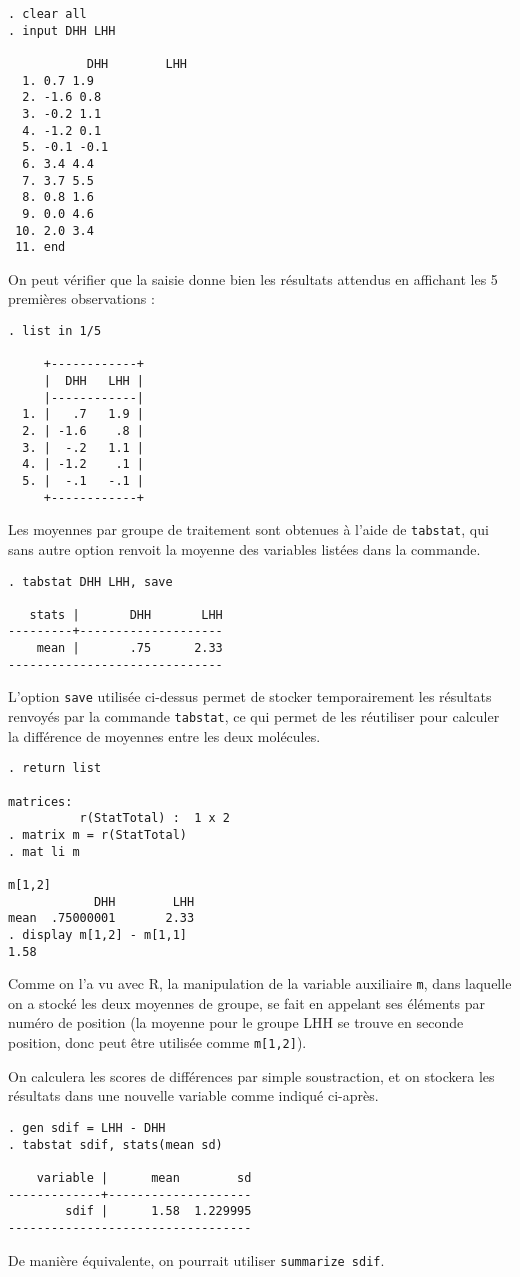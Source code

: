 \begin{verbatim}
. clear all
. input DHH LHH

           DHH        LHH
  1. 0.7 1.9
  2. -1.6 0.8
  3. -0.2 1.1
  4. -1.2 0.1
  5. -0.1 -0.1
  6. 3.4 4.4
  7. 3.7 5.5
  8. 0.8 1.6
  9. 0.0 4.6
 10. 2.0 3.4
 11. end
\end{verbatim}
On peut vérifier que la saisie donne bien les résultats attendus en
affichant les 5 premières observations :
\begin{verbatim}
. list in 1/5

     +------------+
     |  DHH   LHH |
     |------------|
  1. |   .7   1.9 |
  2. | -1.6    .8 |
  3. |  -.2   1.1 |
  4. | -1.2    .1 |
  5. |  -.1   -.1 |
     +------------+
\end{verbatim}

Les moyennes par groupe de traitement sont obtenues à l'aide de
\texttt{tabstat}, qui sans autre option renvoit la moyenne des variables
listées dans la commande.
\begin{verbatim}
. tabstat DHH LHH, save

   stats |       DHH       LHH
---------+--------------------
    mean |       .75      2.33
------------------------------
\end{verbatim}
L'option \texttt{save} utilisée ci-dessus permet de stocker temporairement
les résultats renvoyés par la commande \texttt{tabstat}, ce qui permet de
les réutiliser pour calculer la différence de moyennes entre les deux
molécules. 
\begin{verbatim}
. return list

matrices:
          r(StatTotal) :  1 x 2
. matrix m = r(StatTotal)
. mat li m

m[1,2]
            DHH        LHH
mean  .75000001       2.33
. display m[1,2] - m[1,1]
1.58
\end{verbatim}
Comme on l'a vu avec R, la manipulation de la variable auxiliaire
\texttt{m}, dans laquelle on a stocké les deux moyennes de groupe, se fait
en appelant ses éléments par numéro de position (la moyenne pour le groupe
LHH se trouve en seconde position, donc peut être utilisée comme
\verb|m[1,2]|). 

On calculera les scores de différences par simple soustraction, et on
stockera les résultats dans une nouvelle variable comme indiqué ci-après.
\begin{verbatim}
. gen sdif = LHH - DHH
. tabstat sdif, stats(mean sd)

    variable |      mean        sd
-------------+--------------------
        sdif |      1.58  1.229995
----------------------------------
\end{verbatim}
De manière équivalente, on pourrait utiliser \verb|summarize sdif|.

